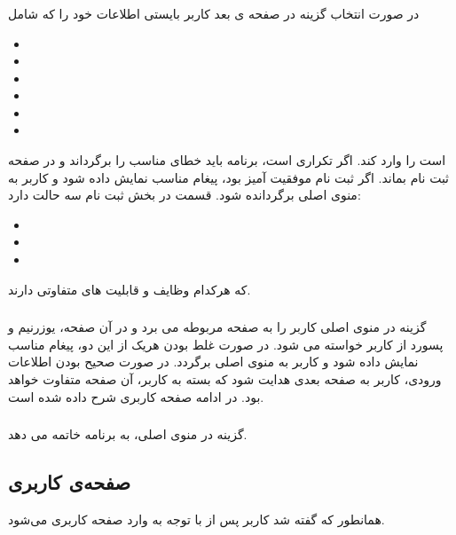 \documentclass{article}
\begin{document}
    \subsubsection{}
    در صورت انتخاب گزینه 
    در صفحه ی بعد کاربر بایستی اطلاعات خود را که شامل 
    \begin{itemize}[label=\textcolor{celestialblue}{\textbullet}]
        \item {}
        \item {}
        \item {}
        \item {}
        \item {}
        \item {}
    \end{itemize}
    است را وارد کند.
    اگر 
    تکراری است، برنامه باید خطای مناسب را برگرداند و 
    در صفحه ثبت نام بماند.
    اگر ثبت نام موفقیت آمیز بود، پیغام مناسب نمایش داده
    شود و کاربر به منوی اصلی برگردانده شود.
    قسمت
    در بخش ثبت نام سه حالت دارد:
    \begin{itemize}[label=\textcolor{celestialblue}{\textbullet}]
        \item {}
        \item {}
        \item {}
    \end{itemize}
    که هرکدام وظایف و قابلیت های متفاوتی دارند.

    \subsubsection{}
    گزینه 
    در منوی اصلی کاربر را به صفحه مربوطه می برد و در آن صفحه،
    یوزرنیم و پسورد از کاربر خواسته می شود.
    در صورت غلط بودن هریک از این دو، پیغام مناسب نمایش 
    داده شود و کاربر به منوی اصلی برگردد.
    در صورت صحیح بودن اطلاعات ورودی، کاربر به صفحه بعدی 
    هدایت شود که بسته به 
    کاربر، آن صفحه متفاوت خواهد بود. در ادامه صفحه کاربری شرح داده شده است.

    \subsubsection{}
    گزینه 
    در منوی اصلی، به برنامه خاتمه می دهد.
    
    \subsection{صفحه‌ی کاربری}
    همانطور که گفته شد کاربر پس از 
    با توجه به 
    وارد صفحه کاربری می‌شود.
\end{document}

